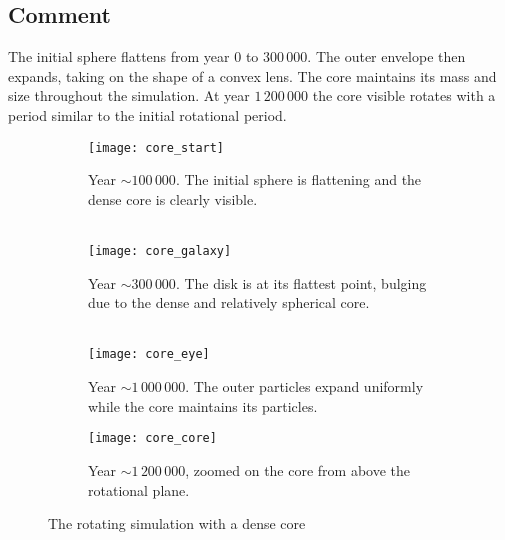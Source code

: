 \documentclass[../main.tex]{subfiles}
\begin{document}
\subsection{Comment}
The initial sphere flattens from year $0$ to $300 \, 000$. The outer envelope then expands, taking
on the shape of a convex lens. The core maintains its mass and size throughout the simulation. At
year $1 \, 200 \, 000$ the core visible rotates with a period similar to the initial rotational
period.

\begin{figure}[p]
  \centering
  \begin{subfigure}[b]{0.495\linewidth}
    \texttt{[image: core\_start]}
    \caption{Year $\sim 100 \, 000$. The initial sphere is flattening and the \\ dense core is clearly
    visible.\\\ }
  \end{subfigure}
  \begin{subfigure}[b]{0.495\linewidth}
    \texttt{[image: core\_galaxy]}
    \caption{Year $\sim 300 \, 000$. The disk is at its flattest point, bulging \\ due to the dense and
    relatively spherical core.\\\ }
  \end{subfigure}
  \begin{subfigure}[b]{0.495\linewidth}
    \texttt{[image: core\_eye]}
    \caption{Year $\sim 1 \, 000 \, 000$. The outer particles expand uniformly \\ while the core
    maintains its particles.}
  \end{subfigure}
  \begin{subfigure}[b]{0.495\linewidth}
    \texttt{[image: core\_core]}
    \caption{Year $\sim 1 \, 200 \, 000$, zoomed on the core from above the \\ rotational plane.}
  \end{subfigure}
  \caption{The rotating simulation with a dense core}
  \label{fig:coffee}
\end{figure}
\restoregeometry
\end{document}

